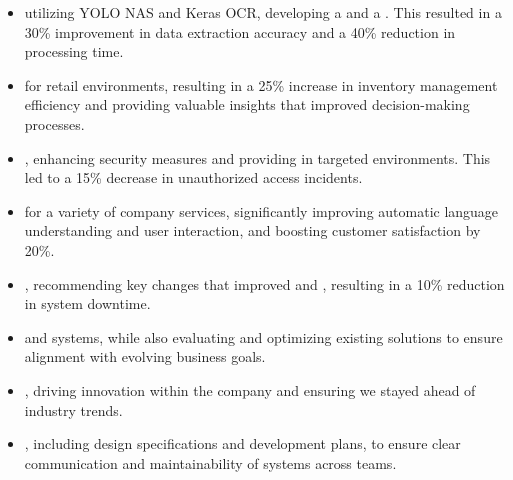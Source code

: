 \divider

\begin{itemize}

  \item {} utilizing YOLO NAS and Keras OCR, developing a  and a . This resulted in a 30\% improvement in data extraction accuracy and a 40\% reduction in processing time.

  \item {} for retail environments, resulting in a 25\% increase in inventory management efficiency and providing valuable insights that improved decision-making processes.

  \item {}, enhancing security measures and providing  in targeted environments. This led to a 15\% decrease in unauthorized access incidents.

  \item {} for a variety of company services, significantly improving automatic language understanding and user interaction, and boosting customer satisfaction by 20\%.

  \item {}, recommending key changes that improved  and , resulting in a 10\% reduction in system downtime.

  \item {} and systems, while also evaluating and optimizing existing solutions to ensure alignment with evolving business goals.

  \item {}, driving innovation within the company and ensuring we stayed ahead of industry trends.

  \item {}, including design specifications and development plans, to ensure clear communication and maintainability of systems across teams.


\end{itemize}
